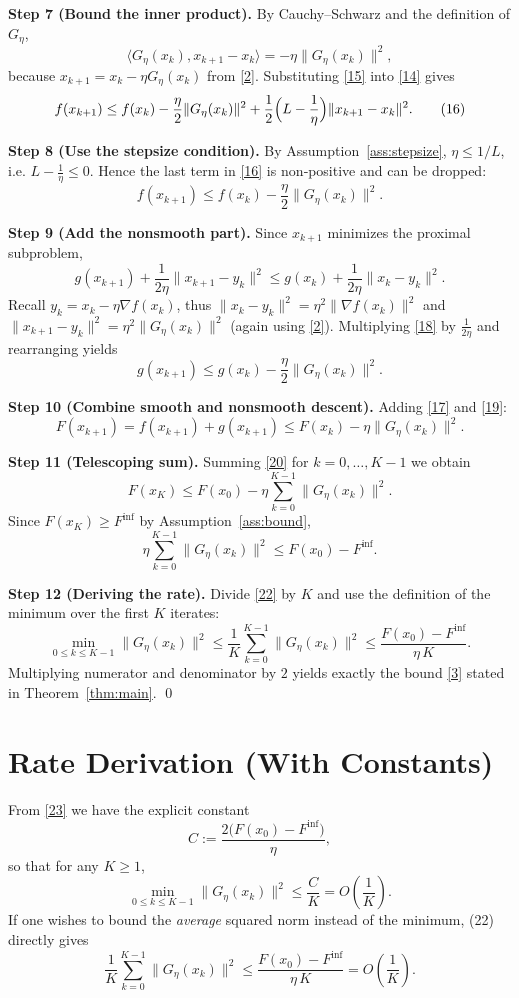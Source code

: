 \documentclass{article}
\newcommand{\grad}{\nabla}
\begin{document}
\noindent\textbf{Step 7 (Bound the inner product).} By Cauchy–Schwarz and the definition of $G_{\eta}$,
\[
\langle G_{\eta}(x_k),x_{k+1}-x_k\rangle
= -\eta\|G_{\eta}(x_k)\|^{2},
\tag{15}
\]
because $x_{k+1}=x_k-\eta G_{\eta}(x_k)$ from \eqref{2}. Substituting \eqref{15} into \eqref{14} gives
\[
f(x_{k+1})\le f(x_k)
           -\frac{\eta}{2}\|G_{\eta}(x_k)\|^{2}
           +\frac{1}{2}\Bigl(L-\frac{1}{\eta}\Bigr)\|x_{k+1}-x_k\|^{2}.
\tag{16}
\]

\noindent\textbf{Step 8 (Use the stepsize condition).} By Assumption~\ref{ass:stepsize}, $\eta\le 1/L$, i.e. $L-\frac{1}{\eta}\le 0$. Hence the last term in \eqref{16} is non‑positive and can be dropped:
\[
f(x_{k+1})\le f(x_k)-\frac{\eta}{2}\|G_{\eta}(x_k)\|^{2}.
\tag{17}
\]

\noindent\textbf{Step 9 (Add the nonsmooth part).} Since $x_{k+1}$ minimizes the proximal subproblem,
\[
g(x_{k+1})+\frac{1}{2\eta}\|x_{k+1}-y_k\|^{2}
\le g(x_k)+\frac{1}{2\eta}\|x_k-y_k\|^{2}.
\tag{18}
\]
Recall $y_k=x_k-\eta\grad f(x_k)$, thus $\|x_k-y_k\|^{2}= \eta^{2}\|\grad f(x_k)\|^{2}$ and
$\|x_{k+1}-y_k\|^{2}= \eta^{2}\|G_{\eta}(x_k)\|^{2}$ (again using \eqref{2}). Multiplying \eqref{18} by $\frac{1}{2\eta}$ and rearranging yields
\[
g(x_{k+1})\le g(x_k)-\frac{\eta}{2}\|G_{\eta}(x_k)\|^{2}.
\tag{19}
\]

\noindent\textbf{Step 10 (Combine smooth and nonsmooth descent).} Adding \eqref{17} and \eqref{19}:
\[
F(x_{k+1}) = f(x_{k+1})+g(x_{k+1})
\le F(x_k)-\eta\|G_{\eta}(x_k)\|^{2}.
\tag{20}
\]

\noindent\textbf{Step 11 (Telescoping sum).} Summing \eqref{20} for $k=0,\dots,K-1$ we obtain
\[
F(x_{K}) \le F(x_{0})-\eta\sum_{k=0}^{K-1}\|G_{\eta}(x_k)\|^{2}.
\tag{21}
\]
Since $F(x_{K})\ge F^{\inf}$ by Assumption~\ref{ass:bound},
\[
\eta\sum_{k=0}^{K-1}\|G_{\eta}(x_k)\|^{2}
\le F(x_{0})-F^{\inf}.
\tag{22}
\]

\noindent\textbf{Step 12 (Deriving the rate).} Divide \eqref{22} by $K$ and use the definition of the minimum over the first $K$ iterates:
\[
\min_{0\le k\le K-1}\|G_{\eta}(x_k)\|^{2}
\le \frac{1}{K}\sum_{k=0}^{K-1}\|G_{\eta}(x_k)\|^{2}
\le \frac{F(x_{0})-F^{\inf}}{\eta\,K}.
\tag{23}
\]
Multiplying numerator and denominator by $2$ yields exactly the bound \eqref{3} stated in Theorem~\ref{thm:main}. \qed

\section*{Rate Derivation (With Constants)}
From \eqref{23} we have the explicit constant
\[
C:=\frac{2\bigl(F(x_{0})-F^{\inf}\bigr)}{\eta},
\]
so that for any $K\ge1$,
\[
\min_{0\le k\le K-1}\|G_{\eta}(x_k)\|^{2}\le \frac{C}{K}=O\!\left(\frac{1}{K}\right).
\]
If one wishes to bound the \emph{average} squared norm instead of the minimum, (22) directly gives
\[
\frac{1}{K}\sum_{k=0}^{K-1}\|G_{\eta}(x_k)\|^{2}\le \frac{F(x_{0})-F^{\inf}}{\eta\,K}=O\!\left(\frac{1}{K}\right).
\]
\end{document}
